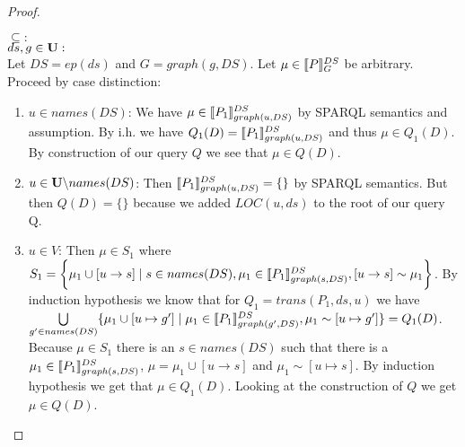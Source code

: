 \begin{proof}
\begin{enumerate}
		$\subseteq:$\\
		$ds,g \in \mathbf{U}:$ \\
		Let $DS = ep(ds)$ and $G = graph(g,DS)$.
		Let $\mu \in \llbracket P \rrbracket^{DS}_{G}$ be arbitrary.
		Proceed by case distinction:
		\begin{enumerate}
			\item $u \in names(DS)$: We have $\mu \in \llbracket P_1
				\rrbracket^{DS}_{graph(u,DS)}$ by SPARQL semantics and assumption. By i.h. we have 
				$Q_1(D) =  \llbracket P_1\rrbracket^{DS}_{graph(u,DS)}$ and thus $\mu \in
				Q_1(D)$. By
				construction of our query $Q$ we see that $\mu \in Q(D)$.

			\item $u \in \mathbf{U} \backslash names(DS)$:
				Then $\llbracket P_1 \rrbracket^{DS}_{graph(u,DS)} = \{\}$ by SPARQL semantics. But then
				$Q(D) = \{\}$ because we added $LOC(u,ds)$ to the root of our
				query Q.
			\item $u \in V$:
				Then $\mu \in S_1$ where\\ $S_1 =  \bigg\{\mu_1 \cup [ u \rightarrow s ] \mid
					s \in names(DS), \mu_1 \in \llbracket P_1
					\rrbracket^{DS}_{graph(s,DS)}, [ u \rightarrow s ] \sim
				\mu_1 \bigg\}$. 
				By induction hypothesis we know that for $Q_1
				= trans(P_1,ds,u)$ we have
				$\bigcup\limits_{g'\in names(DS)} \{ \mu_1 \cup [u\mapsto g'] \mid
					\mu_1 \in \llbracket P_1 \rrbracket^{DS}_{graph(g',DS)}, \mu_1 \sim [u
				\mapsto g']\} = Q_1(D)$. Because $\mu \in S_1$ there
				is an $s \in names(DS)$ such  that there is a $\mu_1 \in \llbracket P_1
				\rrbracket^{DS}_{graph(s,DS)}$, $\mu = \mu_1 \cup [u \rightarrow
				s]$ and  $\mu_1 \sim [u \mapsto s]$. By 
				induction hypothesis we get that $\mu \in Q_1(D)$.
				Looking at the construction of $Q$ we get $\mu \in Q(D)$.
		\end{enumerate}


\end{enumerate}
\end{proof}
